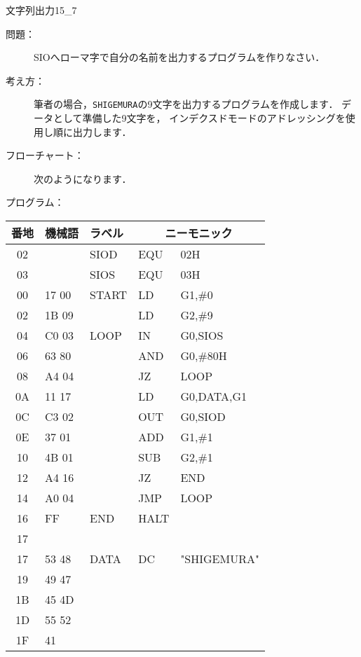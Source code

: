 \newpage
\begin{reidai}{文字列出力1}{5_7}
\begin{description}
\item[問題：] SIOへローマ字で自分の名前を出力するプログラムを作りなさい．

\item[考え方：]
筆者の場合，{\tt SHIGEMURA}の9文字を出力するプログラムを作成します．
データとして準備した9文字を，
インデクスドモードのアドレッシングを使用し順に出力します．

\item[フローチャート：]
次のようになります．

\begin{center}
\end{center}

\item[プログラム：]
\end{description}

{\tt\footnotesize\begin{center}
\begin{tabular}{|c|l|l|l l|} \hline
番地 & 機械語 & ラベル & \multicolumn{2}{|c|}{ニーモニック} \\
\hline
02 &        & SIOD   & EQU    & 02H            \\
03 &        & SIOS   & EQU    & 03H            \\
00 & 17 00  & START  & LD     & G1,\#0         \\
02 & 1B 09  &        & LD     & G2,\#9         \\
04 & C0 03  & LOOP   & IN     & G0,SIOS        \\
06 & 63 80  &        & AND    & G0,\#80H       \\
08 & A4 04  &        & JZ     & LOOP           \\
0A & 11 17  &        & LD     & G0,DATA,G1     \\
0C & C3 02  &        & OUT    & G0,SIOD        \\
0E & 37 01  &        & ADD    & G1,\#1         \\
10 & 4B 01  &        & SUB    & G2,\#1         \\
12 & A4 16  &        & JZ     & END            \\
14 & A0 04  &        & JMP    & LOOP           \\
16 & FF     & END    & HALT   &                \\
17 &        &        &        &                \\
17 & 53 48  & DATA   & DC     & "SHIGEMURA"    \\
19 & 49 47  &        &        &                \\
1B & 45 4D  &        &        &                \\
1D & 55 52  &        &        &                \\
1F & 41     &        &        &                \\
\hline
\end{tabular}
\end{center}}
\end{reidai}

